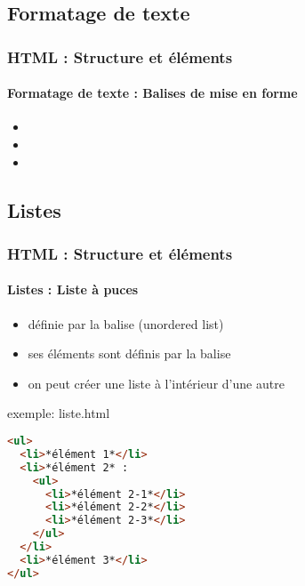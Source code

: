 \documentclass[xcolor=table]{beamer}
\begin{document}
\subsection{Formatage de texte}

\begin{frame}
\frametitle{HTML : Structure et éléments}
\framesubtitle{Formatage de texte : Balises de mise en forme}

\begin{itemize}
	\item  
	\item 
	\item 
\end{itemize}

\end{frame}


\subsection{Listes}

\begin{frame}[fragile]
\frametitle{HTML : Structure et éléments}
\framesubtitle{Listes : Liste à puces}

\begin{minipage}{0.60\textwidth} 
	\begin{itemize}
		\item définie par la balise  (unordered list)
		\item ses éléments sont définis par la balise 
		\item on peut créer une liste à l'intérieur d'une autre
	\end{itemize}
\end{minipage}
%
\begin{minipage}{0.38\textwidth}
\begin{exampleblock}{exemple: liste.html}
\lstset{escapeinside=**}
\scriptsize\bfseries
\begin{lstlisting}[language={html}]
<ul>
  <li>*élément 1*</li>
  <li>*élément 2* :
    <ul>
      <li>*élément 2-1*</li>
      <li>*élément 2-2*</li>
      <li>*élément 2-3*</li>
    </ul>
  </li>
  <li>*élément 3*</li>
</ul>
\end{lstlisting}
\end{exampleblock}
\end{minipage}

\end{frame}
\end{document}
